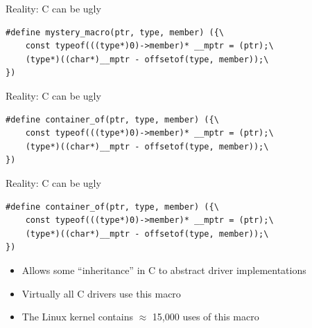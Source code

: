 \documentclass[NET,english,aspectratio=169,notitleframe]{tumbeamer}
\begin{document}
\begin{frame}[fragile]{Reality: C can be ugly}
\begin{verbatim}
#define mystery_macro(ptr, type, member) ({\
	const typeof(((type*)0)->member)* __mptr = (ptr);\
	(type*)((char*)__mptr - offsetof(type, member));\
})
\end{verbatim}
\end{frame}

\begin{frame}[fragile]{Reality: C can be ugly}
\begin{verbatim}
#define container_of(ptr, type, member) ({\
	const typeof(((type*)0)->member)* __mptr = (ptr);\
	(type*)((char*)__mptr - offsetof(type, member));\
})
\end{verbatim}
\end{frame}


\begin{frame}[fragile]{Reality: C can be ugly}
\begin{verbatim}
#define container_of(ptr, type, member) ({\
	const typeof(((type*)0)->member)* __mptr = (ptr);\
	(type*)((char*)__mptr - offsetof(type, member));\
})
\end{verbatim}
\begin{itemize}
\item Allows some ``inheritance'' in C to abstract driver implementations
\item Virtually all C drivers use this macro
\item The Linux kernel contains $\approx$ 15,000 uses of this macro
\end{itemize}
\end{frame}
\end{document}
